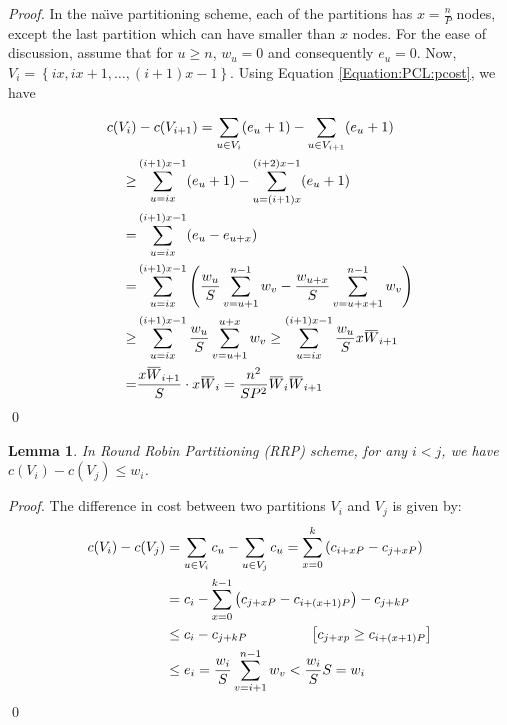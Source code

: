 \documentclass[conference,letterpaper,10pt]{IEEEtran}
\newtheorem{lemma}[theorem]{Lemma}
\newcommand{\overbar}[1]{\mkern 1.5mu\overline{\mkern-1.5mu#1\mkern-1.5mu}\mkern 1.5mu}
\begin{document}
\begin{proof}
In the na\"{\i}ve partitioning scheme, each of the partitions has $x = \frac{n}{P}$ nodes, except the last partition which can have smaller than $x$ nodes. For the ease of discussion, assume that for $u\ge n$, $w_u = 0$ and consequently $e_u = 0$. Now, $V_{i}=\left\{ ix, ix+1, \ldots, (i+1)x-1\right\}$.  Using Equation \ref{Equation:PCL:pcost}, we have

\begin{align*}
c(V_i)&- c(V_{i+1}) = \sum_{u \in V_{i}} (e_{u}+1) - \sum_{u \in V_{i+1}} (e_{u}+1) \\
\hspace{-1.5em}
\ge & \sum_{u=ix}^{(i+1)x - 1} (e_{u}+1) - \sum_{u=(i+1)x}^{(i+2)x - 1} (e_{u}+1) \\
= & \sum_{u=ix}^{(i+1)x - 1} (e_{u} - e_{u+x}) \\
= & \sum_{u=ix}^{(i+1)x - 1} \left( \frac{w_u}{S}\sum\limits_{v=u+1}^{n-1}w_{v} - \frac{w_{u+x}}{S}\sum\limits_{v=u+x+1}^{n-1}w_{v} \right)\\
\ge & \sum_{u=ix}^{(i+1)x - 1} \frac{w_u}{S}\sum\limits_{v=u+1}^{u+x}w_{v}
\ge  \sum_{u=ix}^{(i+1)x - 1} \frac{w_u}{S}x \overbar{W}_{i+1}\\
=&  \frac{x\overbar{W}_{i+1}}{S} \cdot x\overbar{W}_i 
=  \frac{n^2}{SP^2} \overbar{W}_{i}\overbar{W}_{i+1}
\end{align*}
\qed
\end{proof}

\begin{lemma}
\label{lemma:rrp}
In Round Robin Partitioning (RRP) scheme, for any $i<j$, we have $c(V_{i}) - c(V_{j}) \le w_{i}$.
\end{lemma}

\begin{proof}
The difference in  cost between two partitions $V_{i}$ and $V_{j}$ is given by:
\begin{align*}
c(V_{i}) - c(V_{j})  &= \sum_{u \in V_{i}}c_{u} - \sum_{u \in V_{j}}c_{u} =   \sum_{x=0}^{k}  \left(  c_{i+xP}-c_{j+xP} \right)\\
 &= c_{i}- \sum_{x=0}^{k-1} \left( c_{j+xP} - c_{i+(x+1)P} \right)  - c_{j+kP}\\
&\leq c_{i} - c_{j+kP}\text{\phantom{ABCDEF} {$\left[ c_{j+xp} \geq c_{i+(x+1)P} \right]$}}\\
&\leq e_{i} =\frac{w_i}{S}\sum_{v=i+1}^{n-1}w_v < \frac{w_i}{S}S =w_i
\end{align*}
\qed
\end{proof}
\end{document}
